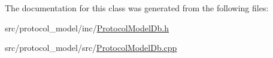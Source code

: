 The documentation for this class was generated from the following files\-:\begin{DoxyCompactItemize}
\item 
src/protocol\-\_\-model/inc/\hyperlink{_protocol_model_db_8h}{Protocol\-Model\-Db.\-h}\item 
src/protocol\-\_\-model/src/\hyperlink{_protocol_model_db_8cpp}{Protocol\-Model\-Db.\-cpp}\end{DoxyCompactItemize}
